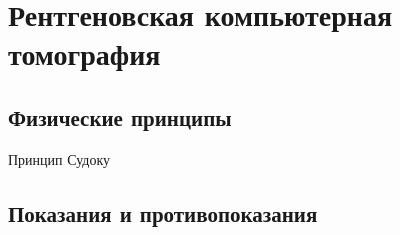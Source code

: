 \section{Рентгеновская компьютерная томография}
\subsection{Физические принципы}
Принцип Судоку
\subsection{Показания и противопоказания}